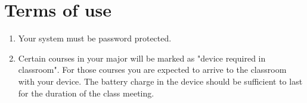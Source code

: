 \section{Terms of use}

\begin{enumerate}
    \item Your system must be password protected.
    
    \item Certain courses in your major will be marked as "device required in classroom". For those courses you are expected to arrive to the classroom with your device. The battery charge in the device should be sufficient to last for the duration of the class meeting.

\end{enumerate}